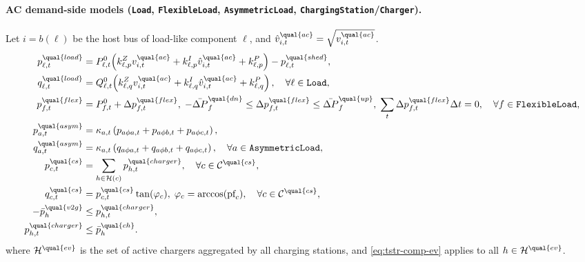 \paragraph{AC demand-side models (\texttt{Load}, \texttt{FlexibleLoad}, \texttt{AsymmetricLoad}, \texttt{ChargingStation}/\texttt{Charger}).}
Let \(i=b(\ell)\) be the host bus of load-like component \(\ell\), and
\(\hat v^{\qual{ac}}_{i,t}=\sqrt{v^{\qual{ac}}_{i,t}}\).
\begin{align}
p^{\qual{load}}_{\ell,t} &=
P^{0}_{\ell,t}\!\left(k^Z_{\ell,p}v^{\qual{ac}}_{i,t}
+k^I_{\ell,p}\hat v^{\qual{ac}}_{i,t}
+k^P_{\ell,p}\right)-p^{\qual{shed}}_{\ell,t},
\label{eq:tstr-comp-load}
\\
q^{\qual{load}}_{\ell,t} &=
Q^{0}_{\ell,t}\!\left(k^Z_{\ell,q}v^{\qual{ac}}_{i,t}
+k^I_{\ell,q}\hat v^{\qual{ac}}_{i,t}
+k^P_{\ell,q}\right),
\quad \forall \ell\in\texttt{Load},
\notag
\\
p^{\qual{flex}}_{f,t}&=P^{0}_{f,t}+\Delta p^{\qual{flex}}_{f,t},
\;
-\bar{\Delta P}^{\qual{dn}}_f\le \Delta p^{\qual{flex}}_{f,t}\le \bar{\Delta P}^{\qual{up}}_f,
\;
\sum_t \Delta p^{\qual{flex}}_{f,t}\Delta t=0,
\quad \forall f\in\texttt{FlexibleLoad},
\label{eq:tstr-comp-flex}
\\
p^{\qual{asym}}_{a,t}&=\kappa_{a,t}\left(p_{a\phi a,t}+p_{a\phi b,t}+p_{a\phi c,t}\right),
\notag\\
q^{\qual{asym}}_{a,t}&=\kappa_{a,t}\left(q_{a\phi a,t}+q_{a\phi b,t}+q_{a\phi c,t}\right),
\quad \forall a\in\texttt{AsymmetricLoad},
\label{eq:tstr-comp-asym}
\\
p^{\qual{cs}}_{c,t}&=\sum_{h\in\mathcal{H}(c)} p^{\qual{charger}}_{h,t},
\quad \forall c\in\mathcal{C}^{\qual{cs}},
\notag\\
q^{\qual{cs}}_{c,t}&=p^{\qual{cs}}_{c,t}\tan(\varphi_c),\;
\varphi_c=\arccos(\text{pf}_c),
\quad \forall c\in\mathcal{C}^{\qual{cs}},
\notag\\
-\bar p_h^{\qual{v2g}}&\le p^{\qual{charger}}_{h,t},
\label{eq:tstr-comp-ev}
\\
p^{\qual{charger}}_{h,t}&\le \bar p_h^{\qual{ch}}.
\notag
\end{align}
where \(\mathcal{H}^{\qual{ev}}\) is the set of active chargers aggregated by
all charging stations, and \eqref{eq:tstr-comp-ev} applies to all
\(h\in\mathcal{H}^{\qual{ev}}\).

